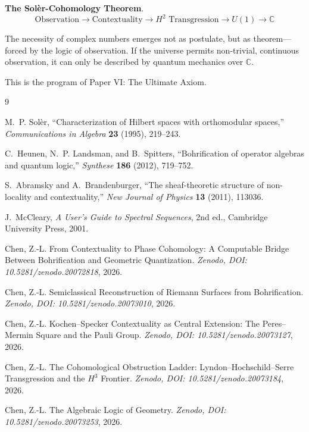\documentclass[11pt]{article}
\begin{document}
\textbf{The Sol\`{e}r-Cohomology Theorem}.
\[
\text{Observation} \rightarrow \text{Contextuality} \rightarrow H^2 \text{ Transgression} \rightarrow U(1) \rightarrow \mathbb{C}
\]

The necessity of complex numbers emerges not as postulate, but as theorem---forced by the logic of observation. If the universe permits non-trivial, continuous observation, it can only be described by quantum mechanics over $\mathbb{C}$.

This is the program of Paper VI: The Ultimate Axiom.

\begin{thebibliography}{9}

M.~P. Sol\`{e}r,
``Characterization of Hilbert spaces with orthomodular spaces,''
\textit{Communications in Algebra} \textbf{23} (1995), 219--243.

C.~Heunen, N.~P. Landsman, and B.~Spitters,
``Bohrification of operator algebras and quantum logic,''
\textit{Synthese} \textbf{186} (2012), 719--752.

S.~Abramsky and A.~Brandenburger,
``The sheaf-theoretic structure of non-locality and contextuality,''
\textit{New Journal of Physics} \textbf{13} (2011), 113036.

J.~McCleary,
\textit{A User's Guide to Spectral Sequences}, 2nd ed.,
Cambridge University Press, 2001.

Chen, Z.-L.
From Contextuality to Phase Cohomology:
A Computable Bridge Between Bohrification and Geometric Quantization.
\textit{Zenodo, DOI: 10.5281/zenodo.20072818}, 2026.

Chen, Z.-L.
Semiclassical Reconstruction of Riemann Surfaces from Bohrification.
\textit{Zenodo, DOI: 10.5281/zenodo.20073010}, 2026.

Chen, Z.-L.
Kochen--Specker Contextuality as Central Extension: The Peres--Mermin Square and the Pauli Group.
\textit{Zenodo, DOI: 10.5281/zenodo.20073127}, 2026.

Chen, Z.-L.
The Cohomological Obstruction Ladder: Lyndon--Hochschild--Serre Transgression and the $H^3$ Frontier.
\textit{Zenodo, DOI: 10.5281/zenodo.20073184}, 2026.

Chen, Z.-L.
The Algebraic Logic of Geometry.
\textit{Zenodo, DOI: 10.5281/zenodo.20073253}, 2026.


\end{thebibliography}
\end{document}
